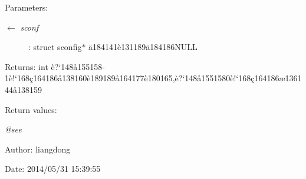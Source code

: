 \begin{Desc}
\item[Parameters:]
\begin{description}
\item[\mbox{$\leftarrow$} {\em sconf}]: struct sconfig$\ast$ \"{a}184141\`{e}131189\"{a}184186NULL \end{description}
\end{Desc}
\begin{Desc}
\item[Returns:]int \`{e}?`148\aa{}155158-1\`{e}!`168\c{c}164186\aa{}138160\`{e}189189\aa{}164177\`{e}180165,\`{e}?`148\aa{}1551580\`{e}!`168\c{c}164186\ae{}136144\aa{}138159 \end{Desc}
\begin{Desc}
\item[Return values:]
\begin{description}
\item[{\em @see}]\end{description}
\end{Desc}
\begin{Desc}
\item[Author:]liangdong \end{Desc}
\begin{Desc}
\item[Date:]2014/05/31 15:39:55 \end{Desc}
